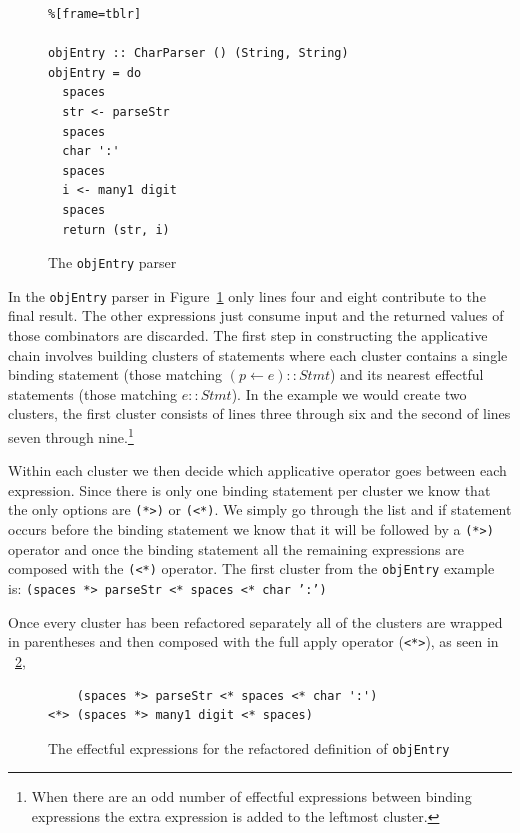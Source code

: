 \begin{figure}[t]
\begin{lstlisting}%[frame=tblr]

objEntry :: CharParser () (String, String)
objEntry = do
  spaces
  str <- parseStr
  spaces
  char ':'
  spaces
  i <- many1 digit
  spaces
  return (str, i)
\end{lstlisting}
\caption{The \texttt{objEntry} parser}
\label{objEntry}
\end{figure}

In the \texttt{objEntry} parser in Figure~\ref{objEntry} only lines four and eight contribute to the final result. The other expressions just consume input and the returned values of those combinators are discarded. The first step in constructing the applicative chain involves building clusters of statements where each cluster contains a single binding statement (those matching $(p \leftarrow e) :: Stmt$) and its nearest effectful statements (those matching $e :: Stmt$). In the \DIFdelbegin {}\DIFdelend example we would create two clusters, the first cluster consists of lines three through six and the second of lines seven through nine.\footnote{When there are an odd number of effectful expressions between binding expressions the extra expression is added to the leftmost cluster.}

Within each cluster we then decide which applicative operator goes between each expression. Since there is only one binding statement per cluster we know that the only options are \texttt{(*>)} or \texttt{(<*)}. We simply go through the list and if \DIFdelbegin {}\DIFdelend \DIFaddbegin {}\DIFaddend statement occurs before the binding statement we know that it will be followed by a \texttt{(*>)} operator and once the binding statement \DIFdelbegin {}\DIFdelend \DIFaddbegin {}\DIFaddend all the remaining expressions are composed with the \texttt{(<*)} operator. The first cluster from the \texttt{objEntry} example is: \texttt{(spaces *> parseStr <* spaces <* char ':')}

Once every cluster has been refactored separately all of the clusters are wrapped in parentheses and then composed with the full apply operator (\texttt{<*>}), as seen in \DIFdelbegin {}\DIFdelend \DIFaddbegin {}\DIFaddend ~\ref{effectObjEntry},

\begin{figure}[t]
\begin{lstlisting}
    (spaces *> parseStr <* spaces <* char ':') 
<*> (spaces *> many1 digit <* spaces)
\end{lstlisting}
\caption{The effectful expressions for the refactored definition of \texttt{objEntry}}
\label{effectObjEntry}
\end{figure}


